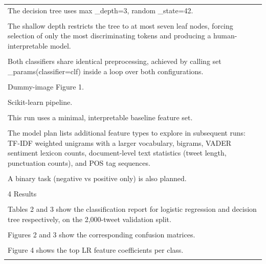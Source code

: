 \documentclass[11pt]{article}
\begin{document}
\begin{longtable}{|p{\dimexpr\linewidth-2\tabcolsep-2\arrayrulewidth\relax}|}
\hline
\rule{0pt}{3.5cm} \\
\hline
The decision tree uses max \_depth=3, random \_state=42. \\[2pt]
\hline
\rule{0pt}{3.5cm} \\
\hline
The shallow depth restricts the tree to at most seven leaf nodes, forcing selection of only the most discriminating tokens and producing a human-interpretable model. \\[2pt]
\hline
\rule{0pt}{3.5cm} \\
\hline
Both classifiers share identical preprocessing, achieved by calling set \_params(classifier=clf) inside a loop over both configurations. \\[2pt]
\hline
\rule{0pt}{3.5cm} \\
\hline
Dummy-image Figure 1. \\[2pt]
\hline
\rule{0pt}{3.5cm} \\
\hline
Scikit-learn pipeline. \\[2pt]
\hline
\rule{0pt}{3.5cm} \\
\hline
This run uses a minimal, interpretable baseline feature set. \\[2pt]
\hline
\rule{0pt}{3.5cm} \\
\hline
The model plan lists additional feature types to explore in subsequent runs: TF-IDF weighted unigrams with a larger vocabulary, bigrams, VADER sentiment lexicon counts, document-level text statistics (tweet length, punctuation counts), and POS tag sequences. \\[2pt]
\hline
\rule{0pt}{3.5cm} \\
\hline
A binary task (negative vs positive only) is also planned. \\[2pt]
\hline
\rule{0pt}{3.5cm} \\
\hline
4 Results \\[2pt]
\hline
\rule{0pt}{3.5cm} \\
\hline
Tables 2 and 3 show the classification report for logistic regression and decision tree respectively, on the 2,000-tweet validation split. \\[2pt]
\hline
\rule{0pt}{3.5cm} \\
\hline
Figures 2 and 3 show the corresponding confusion matrices. \\[2pt]
\hline
\rule{0pt}{3.5cm} \\
\hline
Figure 4 shows the top LR feature coefficients per class. \\[2pt]
\hline
\rule{0pt}{3.5cm} \\
\hline

\end{longtable}
\end{document}
